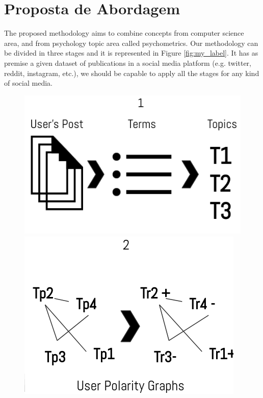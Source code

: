 \chapter{Proposta de Abordagem}\label{cap:proposta}

The proposed methodology aims to combine concepts from computer science area, and from psychology topic area called psychometrics.
Our methodology can be divided in three stages and it is represented in Figure \ref{fig:my_label}. It has as premise a given dataset of publications in a social media platform (e.g. twitter, reddit, instagram, etc.), we should be capable to apply all the stages for any kind of social media. 

\begin{figure}[!h]
    \centering
    \includegraphics[scale=.5]{figs/method_1.png}
    \hspace{.5cm}
    \includegraphics[scale=.5]{figs/method_2.png}\\
    \vspace{.2cm}

\end{figure}
